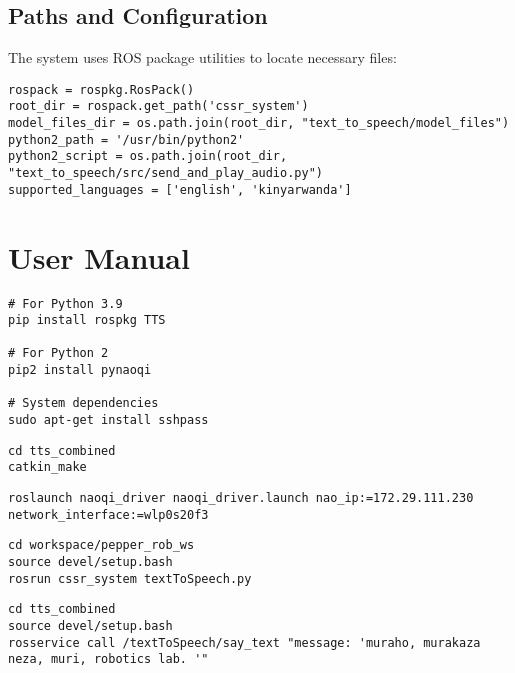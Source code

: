 \documentclass{CSSRforAfrica}
\begin{document}
\subsection{Paths and Configuration}

The system uses ROS package utilities to locate necessary files:

\begin{lstlisting}[style=commandstyle]
rospack = rospkg.RosPack()
root_dir = rospack.get_path('cssr_system')
model_files_dir = os.path.join(root_dir, "text_to_speech/model_files")
python2_path = '/usr/bin/python2'
python2_script = os.path.join(root_dir, "text_to_speech/src/send_and_play_audio.py")
supported_languages = ['english', 'kinyarwanda']
\end{lstlisting}


\section{User Manual}

\begin{lstlisting}[style=commandstyle]
# For Python 3.9
pip install rospkg TTS

# For Python 2
pip2 install pynaoqi

# System dependencies
sudo apt-get install sshpass

\end{lstlisting}

\begin{lstlisting}[style=commandstyle]
cd tts_combined
catkin_make

\end{lstlisting}

\begin{lstlisting}[style=commandstyle]
roslaunch naoqi_driver naoqi_driver.launch nao_ip:=172.29.111.230 network_interface:=wlp0s20f3

\end{lstlisting}


\begin{lstlisting}[style=commandstyle]
cd workspace/pepper_rob_ws
source devel/setup.bash
rosrun cssr_system textToSpeech.py

\end{lstlisting}

\begin{lstlisting}[style=commandstyle]
cd tts_combined
source devel/setup.bash
rosservice call /textToSpeech/say_text "message: 'muraho, murakaza neza, muri, robotics lab. '"

\end{lstlisting}
\end{document}
